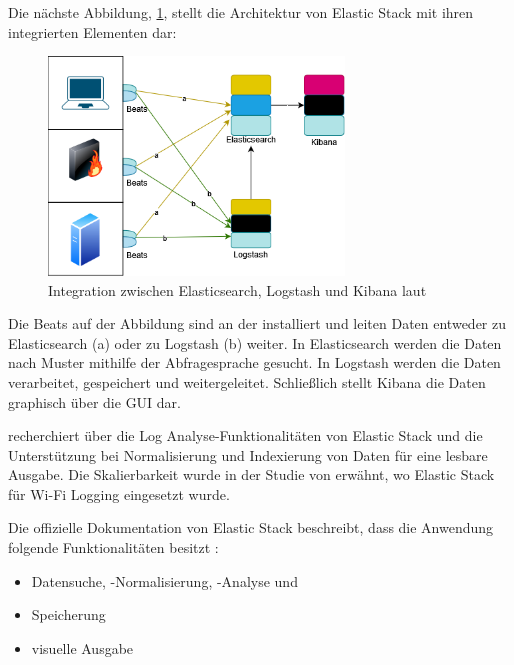 \newpage
Die nächste Abbildung, \ref{fig:Intregation_ELK}, stellt die Architektur von Elastic Stack mit ihren integrierten Elementen dar:

\begin{figure}[H]
   \centering
   \includegraphics[width=0.7\textwidth]{assets/ElasticStack.drawio.png}
   \caption[Integration zwischen Elasticsearch, Logstash und Kibana]
   {Integration zwischen Elasticsearch, Logstash und Kibana laut \cite{packt_elkstack} }
   \label{fig:Intregation_ELK}
   \centering
\end{figure}



Die Beats auf der Abbildung sind an der  installiert und leiten Daten entweder zu Elasticsearch (a) oder zu Logstash (b) weiter. In Elasticsearch werden die Daten nach Muster mithilfe der Abfragesprache  gesucht. In Logstash werden die Daten verarbeitet, gespeichert und weitergeleitet. Schließlich stellt Kibana die Daten graphisch über die \gls{GUI} dar\citep{Jain_LMELK}.

\cite{Advani_elkstakc} recherchiert über die Log Analyse-Funktionalitäten von Elastic Stack und die Unterstützung bei Normalisierung und Indexierung von Daten für eine lesbare Ausgabe. Die Skalierbarkeit wurde in der Studie von \cite{Wang_elkwifi} erwähnt, wo Elastic Stack für Wi-Fi Logging eingesetzt wurde.

Die offizielle Dokumentation von Elastic Stack beschreibt, dass die Anwendung folgende Funktionalitäten besitzt \citep{elastic_docs}:

\begin{itemize}[noitemsep]
   \item Datensuche, -Normalisierung, -Analyse und
   \item Speicherung
   \item visuelle Ausgabe
\end{itemize}

